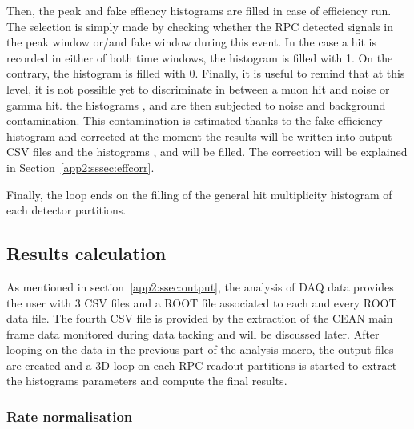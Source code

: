 	Then, the peak and fake effiency histograms are filled in case of efficiency run. The selection is simply made by checking whether the RPC detected signals in the peak window or/and fake window during this event. In the case a hit is recorded in either of both time windows, the histogram is filled with 1. On the contrary, the histogram is filled with 0. Finally, it is useful to remind that at this level, it is not possible yet to discriminate in between a muon hit and noise or gamma hit. the histograms ,  and  are then subjected to noise and background contamination. This contamination is estimated thanks to the fake efficiency histogram  and corrected at the moment the results will be written into output CSV files and the histograms ,  and  will be filled. The correction will be explained in Section~\ref{app2:sssec:effcorr}.
	
	Finally, the loop ends on the filling of the general hit multiplicity histogram of each detector partitions.
	
	\subsection{Results calculation}
	\label{app2:ssec:rate}
		
	As mentioned in section~\ref{app2:ssec:output}, the analysis of DAQ data provides the user with 3 CSV files and a ROOT file associated to each and every ROOT data file. The fourth CSV file is provided by the extraction of the CEAN main frame data monitored during data tacking and will be discussed later. After looping on the data in the previous part of the analysis macro, the output files are created and a 3D loop on each RPC readout partitions is started to extract the histograms parameters and compute the final results.\\
	
		\subsubsection{Rate normalisation}
		\label{app2:sssec:norm}
	
